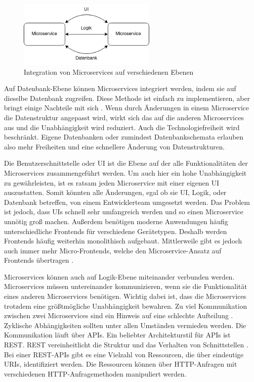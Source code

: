 \begin{figure}[H] 
    \centering
    \includegraphics[width=0.60\textwidth]{figures/IntegrationMicroservices.png}
    \caption{Integration von Microservices auf verschiedenen Ebenen \parencite[vgl.][S. 167]{wolffMicroservices2018}}
\end{figure}

Auf Datenbank-Ebene können Microservices integriert werden, indem sie auf dieselbe Datenbank zugreifen. Diese Methode ist einfach zu implementieren, aber bringt einige Nachteile mit sich \parencite[vgl.][S. 69]{newmanMicroservices2015}. Wenn durch Änderungen in einem Microservice die Datenstruktur angepasst wird, wirkt sich das auf die anderen Microservices aus und die Unabhängigkeit wird reduziert. Auch die Technologiefreiheit wird beschränkt. Eigene Datenbanken oder zumindest Datenbankschemata erlauben also mehr Freiheiten und eine schnellere Änderung von Datenstrukturen.

Die Benutzerschnittstelle oder \ac{UI} ist die Ebene auf der alle Funktionalitäten der Microservices zusammengeführt werden. Um auch hier ein hohe Unabhängigkeit zu gewährleisten, ist es ratsam jeden Microservice mit einer eigenen \ac{UI} auszustatten. Somit könnten alle Änderungen, egal ob sie \ac{UI}, Logik, oder Datenbank betreffen, von einem Entwicklerteam umgesetzt werden. Das Problem ist jedoch, dass \acp{UI} schnell sehr umfangreich werden und so einen Microservice unnötig groß machen. Außerdem benötigen moderne Anwendungen häufig unterschiedliche Frontends für verschiedene Gerätetypen. Deshalb werden Frontends häufig weiterhin monolithisch aufgebaut. Mittlerweile gibt es jedoch auch immer mehr Micro-Frontends, welche den Microservice-Ansatz auf Frontends übertragen \parencite[vgl.][S. 1]{peltonenMotivations2021}.

Microservices können auch auf Logik-Ebene miteinander verbunden werden. Microservices müssen untereinander kommunizieren, wenn sie die Funktionalität eines anderen Microservices benötigen. Wichtig dabei ist, dass die Microservices trotzdem eine größtmögliche Unabhängigkeit bewahren. Zu viel Kommunikation zwischen zwei Microservices sind ein Hinweis auf eine schlechte Aufteilung \parencite[vgl.][S. 104]{wolffMicroservices2018}. Zyklische Abhängigkeiten sollten unter allen Umständen vermieden werden. Die Kommunikation läuft über \acp{API}. Ein beliebter Architekturstil für \acp{API} ist \ac{REST}. \ac{REST} vereinheitlicht die Struktur und das Verhalten von Schnittstellen \parencite[vgl.][S. 76]{fieldingArchitectural2000}. Bei einer \ac{REST}-\acp{API} gibt es eine Vielzahl von Ressourcen, die über eindeutige \acp{URI}, identifiziert werden. Die Ressourcen können über \acs{HTTP}-Anfragen mit verschiedenen \acs{HTTP}-Anfragemethoden manipuliert werden.

